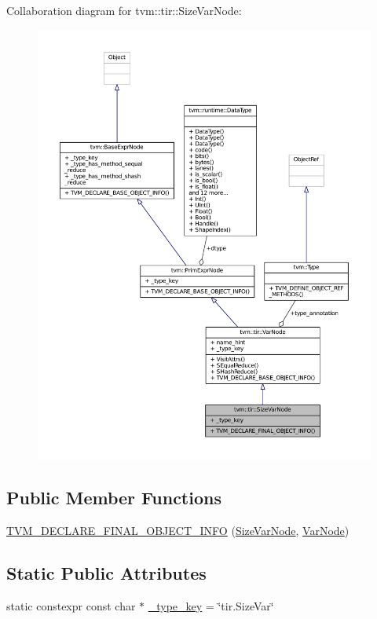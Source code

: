 Collaboration diagram for tvm\+:\+:tir\+:\+:Size\+Var\+Node\+:
\nopagebreak
\begin{figure}[H]
\begin{center}
\leavevmode
\includegraphics[width=350pt]{classtvm_1_1tir_1_1SizeVarNode__coll__graph}
\end{center}
\end{figure}
\subsection*{Public Member Functions}
\begin{DoxyCompactItemize}
\item 
\hyperlink{classtvm_1_1tir_1_1SizeVarNode_a95d4e0d334962e255d25074eb89fa1a5}{T\+V\+M\+\_\+\+D\+E\+C\+L\+A\+R\+E\+\_\+\+F\+I\+N\+A\+L\+\_\+\+O\+B\+J\+E\+C\+T\+\_\+\+I\+N\+FO} (\hyperlink{classtvm_1_1tir_1_1SizeVarNode}{Size\+Var\+Node}, \hyperlink{classtvm_1_1tir_1_1VarNode}{Var\+Node})
\end{DoxyCompactItemize}
\subsection*{Static Public Attributes}
\begin{DoxyCompactItemize}
\item 
static constexpr const char $\ast$ \hyperlink{classtvm_1_1tir_1_1SizeVarNode_afb8eba79487ed933d8777515250b0f73}{\+\_\+type\+\_\+key} = \char`\"{}tir.\+Size\+Var\char`\"{}
\end{DoxyCompactItemize}
